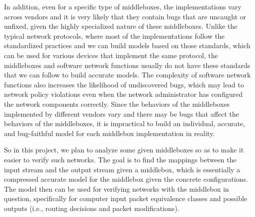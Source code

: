 In addition, even for a specific type of middleboxes, the implementations vary
across vendors and it is very likely that they contain bugs that are uncaught or
unfixed, given the highly specialized nature of these middleboxes. Unlike the
typical network protocols, where most of the implementations follow the
standardized practices and we can build models based on those standards, which
can be used for various devices that implement the same protocol, the
middleboxes and software network functions usually do not have these standards
that we can follow to build accurate models. The complexity of software network
functions also increases the likelihood of undiscovered bugs, which may lead to
network policy violations even when the network administrator has configured the
network components correctly. Since the behaviors of the middleboxes implemented
by different vendors vary and there may be bugs that affect the behaviors of the
middleboxes, it is impractical to build an individual, accurate, and
bug-faithful model for each middlebox implementation in reality.

So in this project, we plan to analyze some given middleboxes so as to make it
easier to verify such networks. The goal is to find the mappings between the
input stream and the output stream given a middlebox, which is essentially a
compressed accurate model for the middlebox given the concrete configurations.
The model then can be used for verifying networks with the middlebox in
question, specifically for computer input packet equivalence classes and
possible outputs (i.e., routing decisions and packet modifications).


